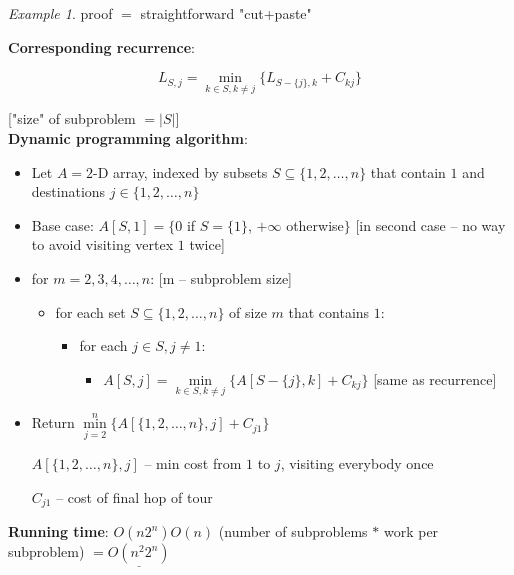 \documentclass[a4paper,12pt]{article}
\theoremstyle{plain}
\theoremstyle{definition}
\theoremstyle{remark}
\newtheorem*{example}{Example}
\begin{document}
\begin{example} proof $=$ straightforward "cut+paste"\end{example}

\textbf{Corresponding recurrence}:

\[
L_{S,j} = \min\limits_{k \in S, k \neq j} \{ L_{S-\{j\},k} + C_{kj} \}
\]

["size" of subproblem $= |S|$]
\\

\textbf{Dynamic programming algorithm}:
\begin{itemize}
	\item Let $A = 2$-D array, indexed by subsets $S \subseteq \{1, 2, \dots, n\}$ that contain $1$ and destinations $j \in \{1, 2, \dots, n\}$
	\item Base case: $A[S,1] = \{0$ if $S=\{1\}$, $+\infty$ otherwise$\}$ [in second case -- no way to avoid visiting vertex $1$ twice]
	\item for $m = 2, 3, 4, \dots, n$: [m -- subproblem size]
	\begin{itemize}
		\item for each set $S \subseteq \{1, 2, \dots, n\}$ of size $m$ that contains $1$:
		\begin{itemize}
			\item for each $j \in S, j \neq 1$:
			\begin{itemize}
				\item $A[S,j] = \min\limits_{k \in S, k \neq j} \{ A[S-\{j\}, k] + C_{kj}\}$ [same as recurrence]
			\end{itemize}
		\end{itemize}
	\end{itemize}
	\item Return $\min\limits_{j = 2}^{n} \{ A[\{1, 2, \dots, n\}, j] + C_{j1} \}$

	$A[\{1, 2, \dots, n\}, j]$ -- min cost from $1$ to $j$, visiting everybody once

	$C_{j1}$ -- cost of final hop of tour
\end{itemize}

\textbf{Running time}: $O(n 2^n) O (n)$ (number of subproblems $*$ work per subproblem) $= \underline{O(n^2 2^n)}$
\end{document}
